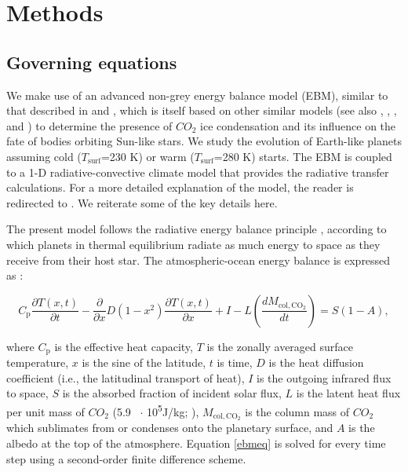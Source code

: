 \documentclass[fleqn,usenatbib]{mnras}
\begin{document}
\section{Methods}
\label{sec:Methods}
\subsection{Governing equations}
We make use of an advanced non-grey energy balance model (EBM), similar to that described in \citet{RamirezLevi2018} and \cite{ramirez2020}, which is itself based on  other similar models (see also \citet{North1979},  \citet{North1981}, \citet{Williams1997}, and \citet{vladilo2013}) to determine the presence of $CO_{\mathrm{2}}$ ice condensation and its influence on the fate of bodies orbiting Sun-like stars. We study the evolution of Earth-like planets assuming cold ($T_{\mathrm{surf}}$=230 K) or warm ($T_{\mathrm{surf}}$=280 K) starts. The EBM is coupled to a 1-D radiative-convective climate model that provides the radiative transfer calculations. For a more detailed explanation of the model, the reader is redirected to \citet{ramirez2020}. We reiterate some of the key details here.

The present model follows the radiative energy balance principle \citep[e.g.,][]{Williams1997}, according to which planets in thermal equilibrium radiate as much energy to space as they receive from their host star. The atmospheric-ocean energy balance is expressed as \citep[e.g.,][]{james1982,Williams1997,batalha2016}: 

\begin{equation}
\label{ebmeq}
    C_{\mathrm{p}} \frac{\partial T(x, t)}{\partial t}-\frac{\partial}{\partial x} D\left(1-x^{2}\right) \frac{\partial T(x, t)}{\partial x}+I-L\left (\frac{dM_{\mathrm{col,CO_{\mathrm{2}}}}}{dt}\right )=S(1-A),
\end{equation}{}

where $C_{\mathrm{p}}$ is the effective heat capacity, $T$ is the zonally averaged surface temperature, $x$ is the sine of the latitude, $t$ is time, $D$ is the heat diffusion coefficient (i.e., the latitudinal transport of heat), $I$ is the outgoing infrared flux to space, $S$ is the absorbed fraction of incident solar flux, $L$ is the latent heat flux per unit mass of $CO_{\mathrm{2}}$ (5.9 \ $\cdot$ 10\textsuperscript{5}J/kg; \citet{forget1998}), $M_{\mathrm{col,CO_{\mathrm{2}}}}$ is the column mass of $CO_{\mathrm{2}}$ which sublimates from or condenses onto the planetary surface, and $A$ is the albedo at the top of the atmosphere. Equation \ref{ebmeq} is solved for every time step using a second-order finite difference scheme.
\end{document}
